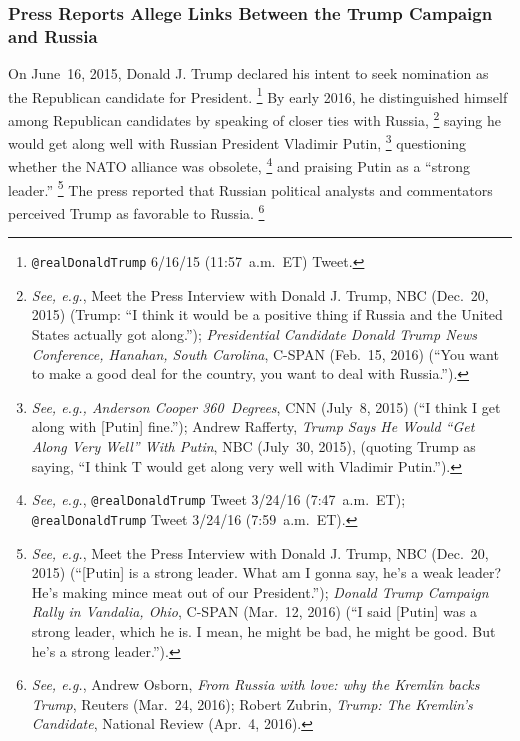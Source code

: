 \subsubsection{Press Reports Allege Links Between the Trump Campaign and Russia}
On June~16, 2015, Donald J. Trump declared his intent to seek nomination as the Republican candidate for President.%
\footnote{\verb+@realDonaldTrump+ 6/16/15 (11:57~a.m.~ET) Tweet.}
By early 2016, he distinguished himself among Republican candidates by speaking of closer ties with Russia,%
\footnote{\textit{See, e.g.}, Meet the Press Interview with Donald J. Trump, NBC (Dec.~20, 2015) (Trump: ``I think it would be a positive thing if Russia and the United States actually got along.'');
\textit{Presidential Candidate Donald Trump News Conference, Hanahan, South Carolina}, C-SPAN (Feb.~15, 2016) (``You want to make a good deal for the country, you want to deal with Russia.'').}
saying he would get along well with Russian President Vladimir Putin,%
\footnote{\textit{See, e.g., Anderson Cooper 360~Degrees}, CNN (July~8, 2015) (``I think I get along with [Putin] fine.'');
Andrew Rafferty, \textit{Trump Says He Would ``Get Along Very Well'' With Putin}, NBC (July~30, 2015), (quoting Trump as saying, ``I think T would get along very well with Vladimir Putin.'').}
questioning whether the NATO alliance was obsolete,%
\footnote{\textit{See, e.g.}, \verb+@realDonaldTrump+ Tweet 3/24/16 (7:47~a.m.~ET);
\verb+@realDonaldTrump+ Tweet 3/24/16 (7:59~a.m.~ET).}
and praising Putin as a ``strong leader.''%
\footnote{\textit{See, e.g.}, Meet the Press Interview with Donald J. Trump, NBC (Dec.~20, 2015) (``[Putin] is a strong leader.
What am I gonna say, he's a weak leader?
He's making mince meat out of our President.'');
\textit{Donald Trump Campaign Rally in Vandalia, Ohio}, C-SPAN (Mar.~12, 2016) (``I said [Putin] was a strong leader, which he is.
I mean, he might be bad, he might be good.
But he's a strong leader.'').}
The press reported that Russian political analysts and commentators perceived Trump as favorable to Russia.%
\footnote{\textit{See, e.g.}, Andrew Osborn, \textit{From Russia with love: why the Kremlin backs Trump}, Reuters (Mar.~24, 2016);
Robert Zubrin, \textit{Trump: The Kremlin's Candidate}, National Review (Apr.~4, 2016).}

